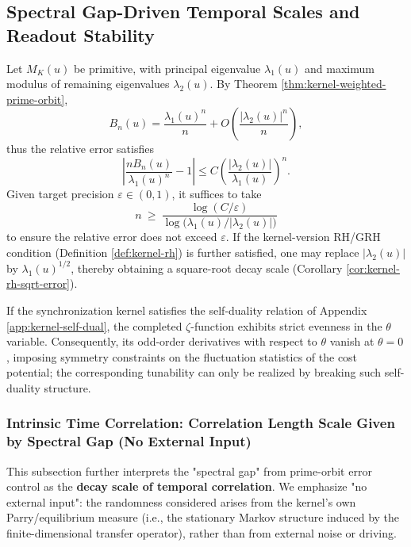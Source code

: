 \subsection{Spectral Gap-Driven Temporal Scales and Readout Stability}\label{subsec:pom-spectral-gap}
\begin{corollary}\label{cor:pom-spectral-gap-time}
Let $M_K(u)$ be primitive, with principal eigenvalue $\lambda_1(u)$ and maximum modulus of remaining eigenvalues $\lambda_2(u)$. By Theorem \ref{thm:kernel-weighted-prime-orbit},
\[
B_n(u)=\frac{\lambda_1(u)^n}{n}+O\!\left(\frac{|\lambda_2(u)|^n}{n}\right),
\]
thus the relative error satisfies
\[
\left|\frac{nB_n(u)}{\lambda_1(u)^n}-1\right|
\le C\left(\frac{|\lambda_2(u)|}{\lambda_1(u)}\right)^n.
\]
Given target precision $\varepsilon\in(0,1)$, it suffices to take
\[
n\ \ge\ \frac{\log(C/\varepsilon)}{\log\!\bigl(\lambda_1(u)/|\lambda_2(u)|\bigr)}
\]
to ensure the relative error does not exceed $\varepsilon$. If the kernel-version RH/GRH condition (Definition \ref{def:kernel-rh}) is further satisfied, one may replace $|\lambda_2(u)|$ by $\lambda_1(u)^{1/2}$, thereby obtaining a square-root decay scale (Corollary \ref{cor:kernel-rh-sqrt-error}).
\end{corollary}

\begin{remark}\label{rem:pom-duality-even}
If the synchronization kernel satisfies the self-duality relation of Appendix \ref{app:kernel-self-dual}, the completed $\zeta$-function exhibits strict evenness in the $\theta$ variable. Consequently, its odd-order derivatives with respect to $\theta$ vanish at $\theta=0$, imposing symmetry constraints on the fluctuation statistics of the cost potential; the corresponding tunability can only be realized by breaking such self-duality structure.
\end{remark}

\subsubsection{Intrinsic Time Correlation: Correlation Length Scale Given by Spectral Gap (No External Input)}

This subsection further interprets the "spectral gap" from prime-orbit error control as the \textbf{decay scale of temporal correlation}. We emphasize "no external input": the randomness considered arises from the kernel's own Parry/equilibrium measure (i.e., the stationary Markov structure induced by the finite-dimensional transfer operator), rather than from external noise or driving.


